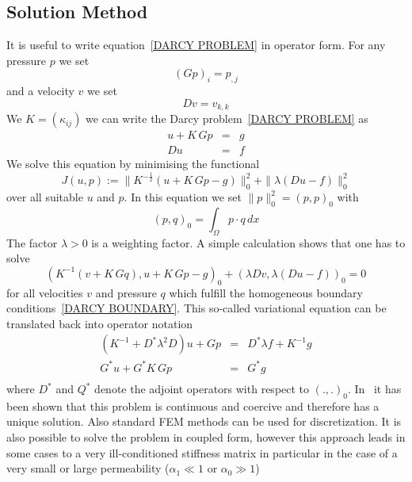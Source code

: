 \subsection{Solution Method \label{DARCY SOLVE}}
It is useful to write equation~\ref{DARCY PROBLEM} in operator form. For any pressure $p$
we set 
\begin{equation}
(Gp)_{i} =  p_{,j}
\end{equation}
and a velocity $v$ we set
\begin{equation}
Dv = v_{k,k}
\end{equation}
We $K=(\kappa_{ij})$ we can write the Darcy problem~\ref{DARCY PROBLEM} as
\begin{equation}
\begin{array}{rcl}
u + K \, Gp & = & g \\
Du & = & f 
\end{array}
\end{equation} 
We solve this equation by minimising the functional
\begin{equation}\label{DARCY COST}
J(u,p):=\|K^{-\frac{1}{2}}(u + K \, G p - g)\|^2_{0} +  \|\lambda (Du-f) \|_{0}^2 
\end{equation} 
over all suitable $u$ and $p$. In this equation we set $\|p\|^2_{0}=(p,p)_{0}$ with
\begin{equation}
(p,q)_{0} = \int_{\Omega } p\cdot q \, dx
\end{equation} 
The factor $\lambda>0$ is a weighting factor.
A simple calculation shows that
one has to solve
\begin{equation}
( K^{-1} (v + K \, Gq) , u +K \, G p - g)_{0} +  (\lambda Dv,\lambda (Du-f) )_{0} =0 
\end{equation} 
for all velocities $v$ and pressure $q$ which fulfill the homogeneous boundary conditions~\ref{DARCY BOUNDARY}.
This so-called variational equation can be translated back into operator notation
\begin{equation}
\begin{array}{rcl}
(K^{-1}+ D^*\lambda^2 D)u + Gp & = &  D^*\lambda f + K^{-1} g \\
G^*u  + G^*K \, G p & = & G^*g \\ 
\end{array}
\end{equation} 
where $D^*$ and $Q^*$ denote the  adjoint operators with respect to $(.,.)_{0}$. 
In~\cite{LEASTSQUARESFEM1994} it has been shown that this problem is continuous and coercive and therefore has a unique solution. Also standard FEM methods can be used for discretization. It is also possible 
to solve the problem in coupled form, however this approach leads in some cases to a very ill-conditioned stiffness matrix in particular in the case of a very small or large permeability ($\alpha_{1} \ll 1$ or $\alpha_{0} \gg 1$)  

